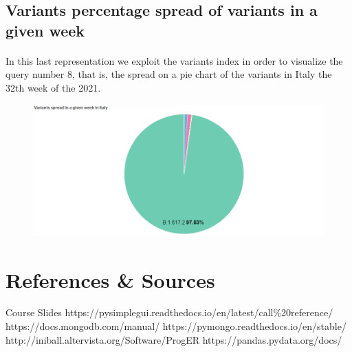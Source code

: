 \documentclass[a4paper,12pt]{article}
\begin{document}
\subsection{Variants percentage spread of variants in a given week}
\paragraph{}In this last representation we exploit the variants index in order to visualize the query number 8, that is, the spread on a pie chart of the variants in Italy the 32th week of the 2021.
\begin{figure}[h]
	\centering
  \includegraphics[width=\linewidth]{dashboards/dash10.png}
\end{figure}

\clearpage
\section{References \& Sources}
  \begin{thebibliography}{9}
    \bibitem{} Course Slides
    \bibitem{} https://pysimplegui.readthedocs.io/en/latest/call\%20reference/
    \bibitem{} https://docs.mongodb.com/manual/
    \bibitem{} https://pymongo.readthedocs.io/en/stable/
    \bibitem{} http://iniball.altervista.org/Software/ProgER
    \bibitem{} https://pandas.pydata.org/docs/
  \end{thebibliography}
\end{document}
